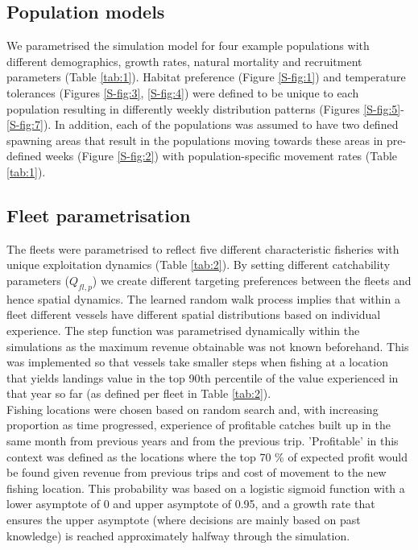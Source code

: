 \documentclass[review]{elsarticle}
\begin{document}
\subsection{Population models}

We parametrised the simulation model for four example populations with
different demographics, growth rates, natural mortality and recruitment
parameters (Table \ref{tab:1}). Habitat preference (Figure \ref{S-fig:1}) and
temperature tolerances (Figures \ref{S-fig:3}, \ref{S-fig:4}) were defined to
be unique to each population resulting in differently weekly distribution
patterns (Figures \ref{S-fig:5}-\ref{S-fig:7}). In addition, each of the
populations was assumed to have two defined spawning areas that result in the
populations moving towards these areas in pre-defined weeks (Figure
\ref{S-fig:2}) with population-specific movement rates (Table \ref{tab:1}).

\subsection{Fleet parametrisation}

The fleets were parametrised to reflect five different characteristic fisheries
with unique exploitation dynamics (Table \ref{tab:2}). By setting different
catchability parameters ($Q_{fl, p}$) we create different targeting preferences
between the fleets and hence spatial dynamics.  The learned random walk process
implies that within a fleet different vessels have different spatial
distributions based on individual experience. The step function was
parametrised dynamically within the simulations as the maximum revenue
obtainable was not known beforehand. This was implemented so that vessels take
smaller steps when fishing at a location that yields landings value in the top
90th percentile of the value experienced in that year so far (as defined per
fleet in Table \ref{tab:2}). \\

Fishing locations were chosen based on random search and, with increasing
proportion as time progressed, experience of profitable catches built up in the
same month from previous years and from the previous trip.  'Profitable' in
this context was defined as the locations where the top 70 \% of expected
profit would be found given revenue from previous trips and cost of movement to
the new fishing location. This probability was based on a logistic sigmoid
function with a lower asymptote of 0 and upper asymptote of 0.95, and a growth
rate that ensures the upper asymptote (where decisions are mainly based on past
knowledge) is reached approximately halfway through the simulation.  \\
\end{document}
